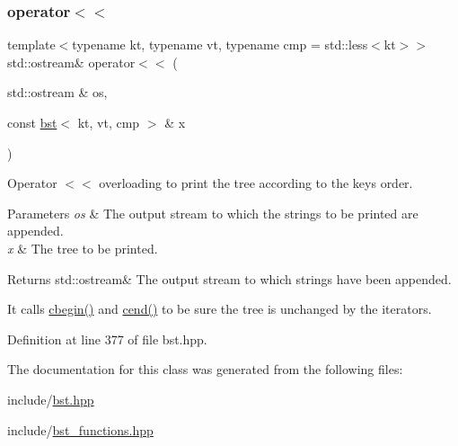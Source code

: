 \subsubsection{\texorpdfstring{operator$<$$<$}{operator<<}}
{\footnotesize\ttfamily template$<$typename kt, typename vt, typename cmp = std\+::less$<$kt$>$$>$ \\
std\+::ostream\& operator$<$$<$ (\begin{DoxyParamCaption}\item[{std\+::ostream \&}]{os,  }\item[{const \hyperlink{classbst}{bst}$<$ kt, vt, cmp $>$ \&}]{x }\end{DoxyParamCaption})\hspace{0.3cm}{\ttfamily [friend]}}



Operator $<$$<$ overloading to print the tree according to the keys order. 


\begin{DoxyParams}{Parameters}
{\em os} & The output stream to which the strings to be printed are appended. \\
\hline
{\em x} & The tree to be printed. \\
\hline
\end{DoxyParams}
\begin{DoxyReturn}{Returns}
std\+::ostream\& The output stream to which strings have been appended.
\end{DoxyReturn}
It calls \hyperlink{classbst_a74e78aa7f879a5df0b933651174de42b}{cbegin()} and \hyperlink{classbst_a2f78931b69f0a121823b60393f1b9745}{cend()} to be sure the tree is unchanged by the iterators. 

Definition at line 377 of file bst.\+hpp.



The documentation for this class was generated from the following files\+:\begin{DoxyCompactItemize}
\item 
include/\hyperlink{bst_8hpp}{bst.\+hpp}\item 
include/\hyperlink{bst__functions_8hpp}{bst\+\_\+functions.\+hpp}\end{DoxyCompactItemize}

